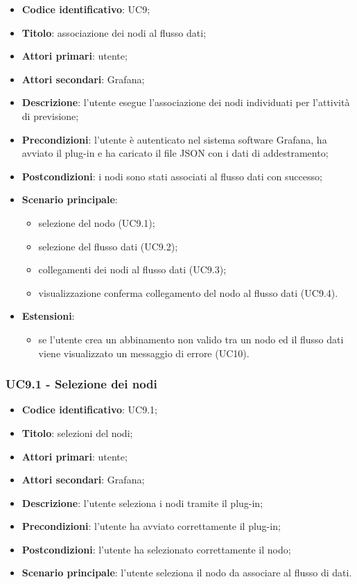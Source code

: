 \begin{itemize}
	\item \textbf{Codice identificativo}: UC9;
	\item \textbf{Titolo}: associazione dei nodi al flusso dati;
	\item \textbf{Attori primari}: utente;
	\item \textbf{Attori secondari}: Grafana\glo;
	\item \textbf{Descrizione}: l'utente esegue l'associazione dei nodi individuati per l'attività di previsione;
	\item \textbf{Precondizioni}: l'utente è autenticato nel sistema software Grafana\glosp, ha avviato il plug-in e ha caricato il file JSON con i dati di addestramento;
	\item \textbf{Postcondizioni}: i nodi sono stati associati al flusso dati con successo;
	\item \textbf{Scenario principale}: 
		\begin{itemize}
			\item selezione del nodo (UC9.1);
			\item selezione del flusso dati (UC9.2);
			\item collegamenti dei nodi al flusso dati (UC9.3);
			\item visualizzazione conferma collegamento del nodo al flusso dati (UC9.4).
		\end{itemize}
	\item \textbf{Estensioni}:
		\begin{itemize}
			\item se l'utente crea un abbinamento non valido tra un nodo ed il flusso dati viene visualizzato un messaggio di errore (UC10).
		\end{itemize}
\end{itemize}

\subsubsection{UC9.1 - Selezione dei nodi}
\begin{itemize}
	\item \textbf{Codice identificativo}: UC9.1;
	\item \textbf{Titolo}: selezioni del nodi;
	\item \textbf{Attori primari}: utente;
	\item \textbf{Attori secondari}: Grafana\glo;
	\item \textbf{Descrizione}: l'utente seleziona i nodi tramite il plug-in;
	\item \textbf{Precondizioni}: l'utente ha avviato correttamente il plug-in;
	\item \textbf{Postcondizioni}: l'utente ha selezionato correttamente il nodo;
	\item \textbf{Scenario principale}: l'utente seleziona il nodo da associare al flusso di dati.
\end{itemize}

